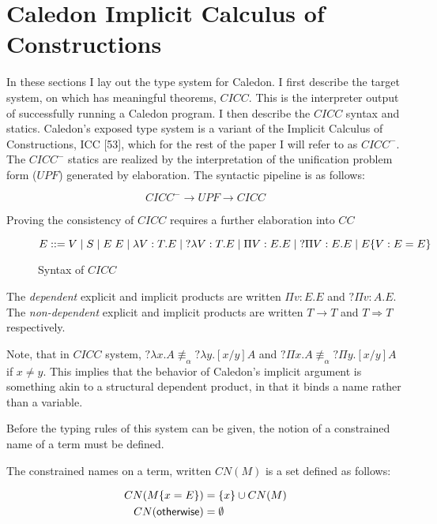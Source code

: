 
\newtheorem{tcases}{Case}


\section{Caledon Implicit Calculus of Constructions}


In these sections I lay out the type system for Caledon. I first describe the target system,
on which has meaningful theorems, $CICC$. 
This is the interpreter output of successfully running a Caledon program. 
I then describe the $CICC$ syntax and statics. 
Caledon’s exposed type system is a variant of the Implicit Calculus of Constructions, ICC [53],
which for the rest of the paper I will refer to as $CICC^-$. The $CICC^-$ statics are realized
by the interpretation of the unification problem form ($UPF$) generated by elaboration.
The syntactic pipeline is as follows:


\[
CICC^- \rightarrow UPF \rightarrow CICC
\]

Proving the consistency of $CICC$ requires a further elaboration into $CC$

\begin{figure}[H]
\[ 
E ::= 
V 
\; | \; S 
\; | \; E\;E 
\; | \; \lambda V : T. E 
\; | \; ?\lambda V : T. E 
\; | \; \Pi V : E . E 
\; | \; ?\Pi V : E . E 
\; | \; E \{ V : E = E \}
\]

\caption{Syntax of $CICC$}
\label{cicc:syntax}
\end{figure}

The \textit{dependent} explicit and implicit products are written $\Pi v : E . E $ and $?\Pi v : A . E$. 
The \textit{non-dependent} explicit and implicit products are written $T \rightarrow T$ 
and $T \Rightarrow T$ respectively.

Note, that in $CICC$ system, $?\lambda x . A \not\equiv_\alpha ?\lambda y . [x / y] A$ 
and $?\Pi x . A \not\equiv_\alpha ?\Pi y . [x / y] A$  if $x \neq y$.  
This implies that the behavior of Caledon's implicit argument is something akin to a structural dependent product, in that it binds a name rather than a variable.   

Before the typing rules of this system can be given, the notion of a constrained name of a term must be defined.

\begin{definition}
The constrained names on a term, written $CN(M)$ is a set defined as follows:

\begin{align}
CN(M \{ x = E \}) &= \{ x \} \cup CN(M)
\\
CN(\mathsf{otherwise}) &= \emptyset
\end{align}

\end{definition}

